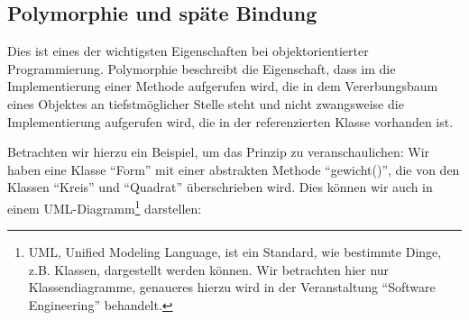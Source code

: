 \subsection{Polymorphie und späte Bindung} \imperativeMark \oopMark

	Dies ist eines der wichtigsten Eigenschaften bei objektorientierter Programmierung. Polymorphie beschreibt die Eigenschaft, dass im die Implementierung einer Methode aufgerufen wird, die in dem Vererbungsbaum eines Objektes an tiefstmöglicher Stelle steht und nicht zwangsweise die Implementierung aufgerufen wird, die in der referenzierten Klasse vorhanden ist.
	
	Betrachten wir hierzu ein Beispiel, um das Prinzip zu veranschaulichen: Wir haben eine Klasse \enquote{Form} mit einer abstrakten Methode \enquote{gewicht()}, die von den Klassen \enquote{Kreis} und \enquote{Quadrat} überschrieben wird. Dies können wir auch in einem UML-Diagramm\footnote{UML, Unified Modeling Language, ist ein Standard, wie bestimmte Dinge, z.B. Klassen, dargestellt werden können. Wir betrachten hier nur Klassendiagramme, genaueres hierzu wird in der Veranstaltung \enquote{Software Engineering} behandelt.} darstellen: 
	\begin{figure}[H]
		\centering
	\end{figure}
